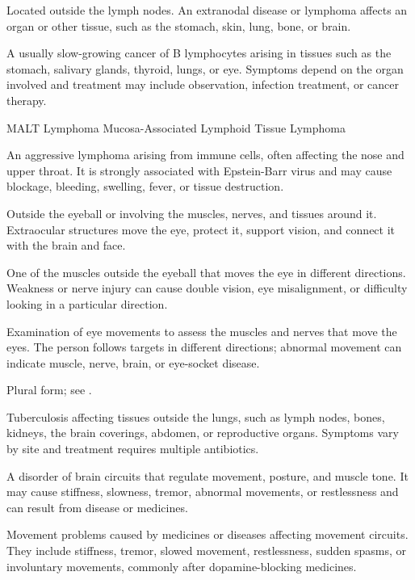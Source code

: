  Located outside the lymph nodes. An extranodal disease or lymphoma affects an organ or other tissue, such as the stomach, skin, lung, bone, or brain.

 A usually slow-growing cancer of B lymphocytes arising in tissues such as the stomach, salivary glands, thyroid, lungs, or eye. Symptoms depend on the organ involved and treatment may include observation, infection treatment, or cancer therapy.

\synonyms
MALT Lymphoma
Mucosa-Associated Lymphoid Tissue Lymphoma

 An aggressive lymphoma arising from immune cells, often affecting the nose and upper throat. It is strongly associated with Epstein-Barr virus and may cause blockage, bleeding, swelling, fever, or tissue destruction.

 Outside the eyeball or involving the muscles, nerves, and tissues around it. Extraocular structures move the eye, protect it, support vision, and connect it with the brain and face.

 One of the muscles outside the eyeball that moves the eye in different directions. Weakness or nerve injury can cause double vision, eye misalignment, or difficulty looking in a particular direction.

 Examination of eye movements to assess the muscles and nerves that move the eyes. The person follows targets in different directions; abnormal movement can indicate muscle, nerve, brain, or eye-socket disease.

 Plural form; see .

 Tuberculosis affecting tissues outside the lungs, such as lymph nodes, bones, kidneys, the brain coverings, abdomen, or reproductive organs. Symptoms vary by site and treatment requires multiple antibiotics.

 A disorder of brain circuits that regulate movement, posture, and muscle tone. It may cause stiffness, slowness, tremor, abnormal movements, or restlessness and can result from disease or medicines.

 Movement problems caused by medicines or diseases affecting movement circuits. They include stiffness, tremor, slowed movement, restlessness, sudden spasms, or involuntary movements, commonly after dopamine-blocking medicines.


